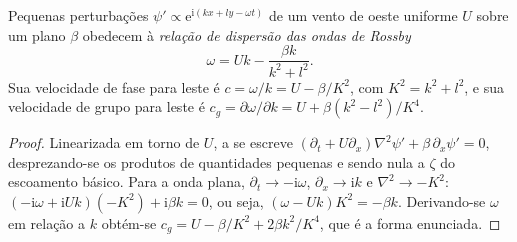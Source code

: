 \begin{theorem}\label{thm:b3:atmospheric-dynamics:rossby}
Pequenas perturbações $\psi' \propto \mathrm e^{\mathrm i(kx + ly - \omega t)}$
de um vento de oeste uniforme $U$ sobre um plano $\beta$ obedecem à
\emph{relação de dispersão das ondas de Rossby}
\[
\omega = Uk - \frac{\beta k}{k^2 + l^2} .
\]
Sua velocidade de fase para leste é $c = \omega/k = U - \beta/K^2$, com $K^2 =
k^2 + l^2$, e sua velocidade de grupo para leste é $c_g = \partial\omega/\partial
k = U + \beta(k^2 - l^2)/K^4$.
\end{theorem}

\begin{proof}
Linearizada em torno de $U$, a  se escreve
$(\partial_t + U\partial_x)\nabla^2\psi' + \beta\,\partial_x\psi' = 0$, desprezando-se
os produtos de quantidades pequenas e sendo nula a $\zeta$ do escoamento básico.
Para a onda plana, $\partial_t \to -\mathrm i\omega$,
$\partial_x \to \mathrm ik$ e $\nabla^2 \to -K^2$: $(-\mathrm i\omega +
\mathrm iUk)(-K^2) + \mathrm i\beta k = 0$, ou seja, $(\omega - Uk)K^2 =
-\beta k$. Derivando-se $\omega$ em relação a $k$ obtém-se $c_g = U -
\beta/K^2 + 2\beta k^2/K^4$, que é a forma enunciada.
\end{proof}

